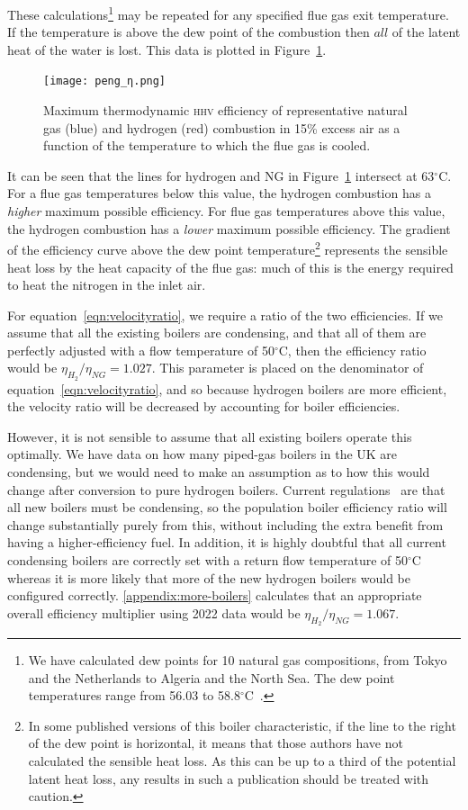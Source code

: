 \documentclass[5p]{elsarticle} %
\begin{document}
These calculations\footnote{
We have calculated dew points for 10 natural gas compositions, from Tokyo and the Netherlands to Algeria and the North Sea. The dew point temperatures range from 56.03 to 58.8$^\circ$C~\citep{Sargents_github}.
} may be repeated for any specified flue gas exit temperature. 
If the temperature is above the dew point of the combustion then $all$ of the latent heat of the water is lost.
This data is plotted in Figure~\ref{fig:efficiency}.

\begin{figure}[ht]
    \centering
    \texttt{[image: peng\_η.png]}
    \caption{ Maximum thermodynamic \textsc{hhv} efficiency of representative natural gas (blue) and hydrogen (red) combustion in 15\% excess air as a function of the temperature to which the flue gas is cooled. }
    \label{fig:efficiency}
\end{figure}

It can be seen that the lines for hydrogen and NG in Figure~\ref{fig:efficiency} intersect at 63$^\circ$C.
For a flue gas temperatures below this value, the hydrogen combustion has a \emph{higher} maximum possible efficiency.
For flue gas temperatures above this value, the hydrogen combustion has a \emph{lower} maximum possible efficiency.
The gradient of the efficiency curve above the dew point temperature\footnote{In some published versions of this boiler characteristic, if the line to the right of the dew point is horizontal, it means that those authors have not calculated the sensible heat loss. 
As this can be up to a third of the potential latent heat loss, any results in such a publication should be treated with caution.} represents the sensible heat loss by the heat capacity of the flue gas: much of this is the energy required to heat the nitrogen in the inlet air. 

For equation~\eqref{eqn:velocityratio}, we require a ratio of the two efficiencies.
If we assume that all the existing boilers are condensing, and that all of them are perfectly adjusted with a flow temperature of 50$^\circ$C, then the efficiency ratio would be $\eta_{H_2} / \eta_{NG}  = 1.027$.
This parameter is placed on the denominator of equation~\eqref{eqn:velocityratio}, and so because hydrogen boilers are more efficient, the velocity ratio will be decreased by accounting for boiler efficiencies.

However, it is not sensible to assume that all existing boilers operate this optimally.
We have data on how many piped-gas boilers in the UK are condensing, but we would need to make an assumption as to how this would change after conversion to pure hydrogen boilers. 
Current regulations~\citep{GASTEC2009} are that all new boilers must be condensing, so the population boiler efficiency ratio will change substantially purely from this, without including the extra benefit from having a higher-efficiency fuel. 
In addition, it is highly doubtful that all current condensing boilers are correctly set with a return flow temperature of 50$^\circ$C whereas it is more likely that more of the new hydrogen boilers would be configured correctly. 
\ref{appendix:more-boilers} calculates that an appropriate overall efficiency multiplier using 2022 data would be $\eta_{H_2} / \eta_{NG} = 1.067$.
\end{document}
